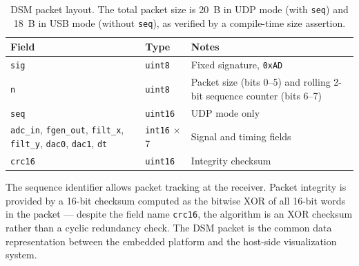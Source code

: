 \begin{table}[H]
    \centering
    \small
    \begin{tabularx}{\textwidth}{@{}l l X@{}}
        \toprule
        \textbf{Field}                                              & \textbf{Type} & \textbf{Notes} \\
        \midrule
        \texttt{sig}                                                &
        \texttt{uint8}                                              &
        Fixed signature, \texttt{0xAD}                                                               \\

        \texttt{n}                                                  &
        \texttt{uint8}                                              &
        Packet size (bits 0--5) and rolling 2-bit sequence counter
        (bits 6--7)                                                                                  \\

        \texttt{seq}                                                &
        \texttt{uint16}                                             &
        UDP mode only                                                                                \\

        \texttt{adc\_in}, \texttt{fgen\_out}, \texttt{filt\_x},
        \texttt{filt\_y}, \texttt{dac0}, \texttt{dac1}, \texttt{dt} &
        \texttt{int16} $\times$ 7                                   &
        Signal and timing fields                                                                     \\

        \texttt{crc16}                                              &
        \texttt{uint16}                                             &
        Integrity checksum                                                                           \\
        \bottomrule
    \end{tabularx}
    \caption{DSM packet layout. The total packet size is 20~B in UDP mode
        (with \texttt{seq}) and 18~B in USB mode (without \texttt{seq}), as
        verified by a compile-time size assertion.}
    \label{tab:dsm_layout}
\end{table}

The sequence identifier allows packet tracking at the receiver. Packet
integrity is provided by a 16-bit checksum computed as the bitwise XOR of all
16-bit words in the packet — despite the field name \texttt{crc16}, the
algorithm is an XOR checksum rather than a cyclic redundancy check. The DSM
packet is the common data representation between the embedded platform and the
host-side visualization system.

